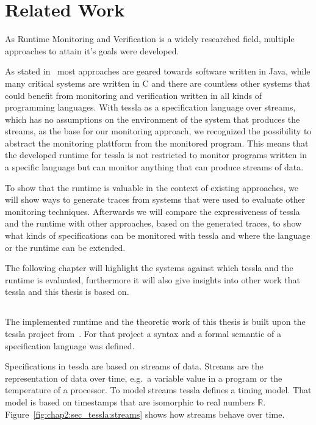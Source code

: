 %
\chapter{Related Work}
\label{sec:related}

As Runtime Monitoring and Verification is a widely researched field, multiple approaches to attain it's goals were developed.

As stated in~\cite{Havelund2008} most approaches are geared towards software written in Java, while many critical systems are written in C and there are countless other systems that could benefit from monitoring and verification written in all kinds of programming languages.
With \gls{tessla} as a specification language over streams, which has no assumptions on the environment of the system that produces the streams,  as the base for our monitoring approach, we recognized the possibility to abstract the monitoring plattform from the monitored program.
This means that the developed runtime for \gls{tessla} is not restricted to monitor programs written in a specific language but can monitor anything that can produce streams of data.

To show that the runtime is valuable in the context of existing approaches, we will show ways to generate traces from systems that were used to evaluate other monitoring techniques.
Afterwards we will compare the expressiveness of \gls{tessla} and the runtime with other approaches, based on the generated traces, to show what kinds of specifications can be monitored with \gls{tessla} and where the language or the runtime can be extended.

The following chapter will highlight the systems against which \gls{tessla} and the runtime is evaluated, furthermore it will also give insights into other work that \gls{tessla} and this thesis is based on.

\section{}
\label{sec:related:tessla}

The implemented runtime and the theoretic work of this thesis is built upon the \gls{tessla} project from~\cite{Decker2016}.
For that project a syntax and a formal semantic of a specification language was defined.

Specifications in \gls{tessla} are based on streams of data.
Streams are the representation of data over time, e.g.\ a variable value in a program or the temperature of a processor.
To model streams \gls{tessla} defines a timing model.
That model is based on timestamps that are isomorphic to real numbers \(\mathbb{R}\).
Figure~\ref{fig:chap2:sec_tessla:streams} shows how streams behave over time.

